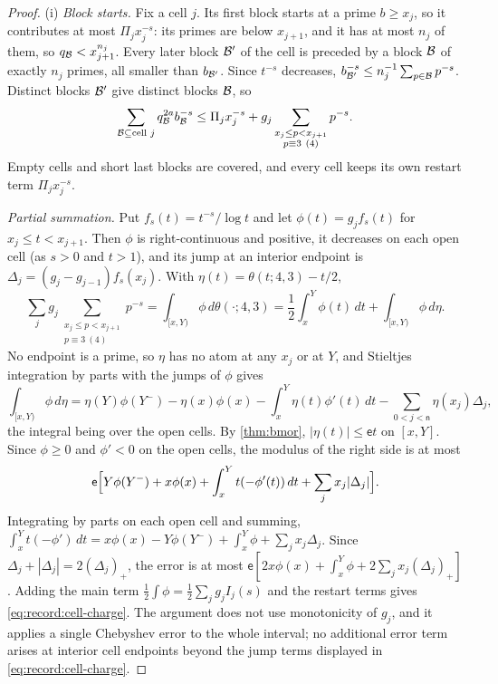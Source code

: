 \begin{proof}
(i) \emph{Block starts.} Fix a cell $j$. Its first block starts at a prime
$b\ge x_j$, so it contributes at most $\Pi_jx_j^{-s}$: its primes are
below $x_{j+1}$, and it has at most $n_j$ of them, so
$q_{\mathcal B}<x_{j+1}^{n_j}$. Every later block $\mathcal B'$ of the cell is preceded by
a block $\mathcal B$ of exactly $n_j$ primes, all smaller than $b_{\mathcal B'}$. Since
$t^{-s}$ decreases, $b_{\mathcal B'}^{-s}\le n_j^{-1}\sum_{p\in\mathcal B}p^{-s}$.
Distinct blocks $\mathcal B'$ give distinct blocks $\mathcal B$, so
\[
 \sum_{\Blk\subseteq\text{cell }j}q_{\Blk}^{2a}b_{\Blk}^{-s}\le\Pi_jx_j^{-s}
  +g_j\sum_{\substack{x_j\le p<x_{j+1}\\ p\equiv3\ (4)}}p^{-s}.
\]
Empty cells and short last blocks are covered, and every cell keeps its
own restart term $\Pi_jx_j^{-s}$.

\emph{Partial summation.} Put $f_s(t)=t^{-s}/\log t$ and let
$\phi(t)=g_jf_s(t)$ for $x_j\le t<x_{j+1}$. Then $\phi$ is right-continuous
and positive, it decreases on each open cell (as $s>0$ and $t>1$), and its
jump at an interior endpoint is $\Delta_j=(g_j-g_{j-1})f_s(x_j)$. With
$\eta(t)=\theta(t;4,3)-t/2$,
\[
 \sum_jg_j\sum_{\substack{x_j\le p<x_{j+1}\\ p\equiv3\ (4)}}p^{-s}
 =\int_{[x,Y)}\phi\,d\theta(\cdot;4,3)
 =\frac12\int_x^Y\phi(t)\,dt+\int_{[x,Y)}\phi\,d\eta .
\]
No endpoint is a prime, so $\eta$ has no atom at any $x_j$ or at $Y$, and
Stieltjes integration by parts with the jumps of $\phi$ gives
\[
 \int_{[x,Y)}\phi\,d\eta=\eta(Y)\phi(Y^-)-\eta(x)\phi(x)-\int_x^Y\eta(t)\phi'(t)\,dt
 -\sum_{0<j<\mathsf n}\eta(x_j)\Delta_j ,
\]
the integral being over the open cells. By \cref{thm:bmor},
$|\eta(t)|\le\mathsf et$ on $[x,Y]$. Since $\phi\ge0$ and $\phi'<0$ on the
open cells, the modulus of the right side is at most
\[
 \mathsf e\Bigl[Y\phi(Y^-)+x\phi(x)+\int_x^Yt(-\phi'(t))\,dt
 +\sum_jx_j|\Delta_j|\Bigr].
\]
Integrating by parts on each open cell and summing,
$\int_x^Yt(-\phi')\,dt=x\phi(x)-Y\phi(Y^-)+\int_x^Y\phi+\sum_jx_j\Delta_j$.
Since $\Delta_j+|\Delta_j|=2(\Delta_j)_+$, the error is at most
$\mathsf e[2x\phi(x)+\int_x^Y\phi+2\sum_jx_j(\Delta_j)_+]$. Adding the main
term $\frac12\int\phi=\frac12\sum_jg_jI_j(s)$ and the restart terms gives
\eqref{eq:record:cell-charge}. The argument does not use monotonicity of
$g_j$, and it applies a single Chebyshev error to the whole interval; no additional error term arises at interior cell
endpoints beyond the jump terms displayed in
\eqref{eq:record:cell-charge}.


\end{proof}
